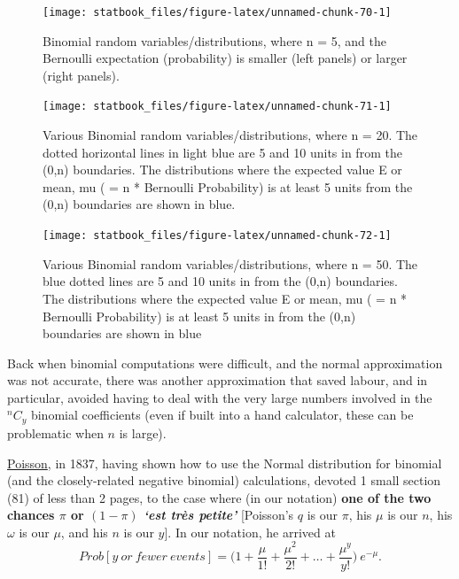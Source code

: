 \documentclass[]{book}
\begin{document}
\begin{figure}

\texttt{[image: statbook\_files/figure-latex/unnamed-chunk-70-1]} \hfill{}

\caption{Binomial random variables/distributions, where n = 5, and the Bernoulli expectation (probability) is smaller (left panels) or larger (right panels).}\label{fig:unnamed-chunk-70}
\end{figure}

\begin{figure}

\texttt{[image: statbook\_files/figure-latex/unnamed-chunk-71-1]} \hfill{}

\caption{Various Binomial random variables/distributions, where n = 20. The dotted horizontal lines in light blue are 5 and 10 units in from the (0,n) boundaries. The distributions where the expected value E or mean, mu ( = n * Bernoulli Probability) is at least 5 units from the (0,n) boundaries are shown in blue.}\label{fig:unnamed-chunk-71}
\end{figure}

\begin{figure}

\texttt{[image: statbook\_files/figure-latex/unnamed-chunk-72-1]} \hfill{}

\caption{Various Binomial random variables/distributions, where n = 50. The blue dotted lines are 5 and 10 units in from the (0,n) boundaries. The distributions where the expected value E or mean, mu ( = n * Bernoulli Probability) is at least 5 units in from the (0,n) boundaries are shown in blue}\label{fig:unnamed-chunk-72}
\end{figure}

Back when binomial computations were difficult, and the normal approximation was not accurate, there was another approximation that saved labour, and in particular, avoided having to deal with the very large numbers involved in the \(^nC_y\) binomial coefficients (even if built into a hand calculator, these can be problematic when \(n\) is large).

\href{http://www.biostat.mcgill.ca/hanley/statbook/Poisson1837Excerpts.pdf}{Poisson}, in 1837, having shown how to use the Normal distribution for binomial (and the closely-related negative binomial) calculations, devoted 1 small section (81) of less than 2 pages, to the case where (in our notation) \textbf{one of the two chances \(\pi\) or \((1-\pi)\) \emph{`est très petite'}} {[}Poisson's \(q\) is our \(\pi\), his \(\mu\) is our \(n\), his \(\omega\) is our \(\mu\), and his \(n\) is our \(y\){]}. In our notation, he arrived at
\[Prob[y \ or \ fewer \ events] = \bigg(1 + \frac{\mu}{1!} + \frac{\mu^2}{2!} + \dots + \frac{\mu^y}{y!} \bigg) \  e^{-\mu}.\]
\end{document}
